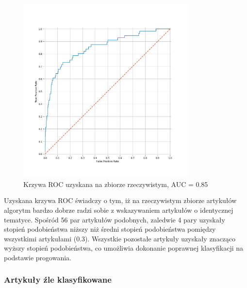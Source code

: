 \begin{figure}[H]
\centering
\includegraphics[width=0.8\textwidth]{./pict/roc_identical.png}
\caption{Krzywa ROC uzyskana na zbiorze rzeczywistym, AUC = 0.85}
\label{fig:rocidentical}
\end{figure}

Uzyskana krzywa ROC świadczy o tym, iż na rzeczywistym zbiorze artykułów algorytm bardzo dobrze radzi sobie z wskazywaniem artykułów o identycznej tematyce. Spośród 56 par artykułów podobnych, zaledwie 4 pary uzyskały stopień podobieństwa niższy niż średni stopień podobieństwa pomiędzy wszystkimi artykułami (0.3). Wszystkie pozostałe artykuły uzyskały znacząco wyższy stopień podobieństwa, co umożliwia dokonanie poprawnej klasyfikacji na podstawie progowania.



\subsubsection*{Artykuły źle klasyfikowane}

